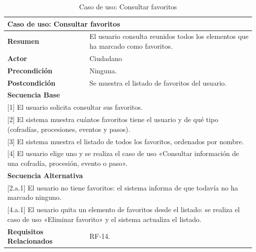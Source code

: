 \begin{table}[h!]
    \centering
    \renewcommand{\arraystretch}{1.5}

    \begin{tabular}{|p{4cm}|p{11cm}|}
        \hline
        \multicolumn{2}{|l|}{\textbf{Caso de uso: Consultar favoritos}} \\
        \hline
        \textbf{Resumen} & El usuario consulta reunidos todos los elementos que ha marcado como favoritos. \\
        \hline
        \textbf{Actor} & Ciudadano \\
        \hline
        \textbf{Precondición} & Ninguna. \\
        \hline
        \textbf{Postcondición} & Se muestra el listado de favoritos del usuario. \\
        \hline
        \multicolumn{2}{|l|}{\textbf{Secuencia Base}} \\
        \hline
        \multicolumn{2}{|p{15cm}|}{ [1] El usuario solicita consultar sus favoritos. } \\
        \hline
        \multicolumn{2}{|p{15cm}|}{ [2] El sistema muestra cuántos favoritos tiene el usuario y de qué tipo (cofradías, procesiones, eventos y pasos). } \\
        \hline
        \multicolumn{2}{|p{15cm}|}{ [3] El sistema muestra el listado de todos los favoritos, ordenados por nombre. } \\
        \hline
        \multicolumn{2}{|p{15cm}|}{ [4] El usuario elige uno y se realiza el caso de uso «Consultar información de una cofradía, procesión, evento o paso». } \\
        \hline
        \multicolumn{2}{|l|}{\textbf{Secuencia Alternativa}} \\
        \hline
        \multicolumn{2}{|p{15cm}|}{ [2.a.1] El usuario no tiene favoritos: el sistema informa de que todavía no ha marcado ninguno. } \\
        \hline
        \multicolumn{2}{|p{15cm}|}{ [4.a.1] El usuario quita un elemento de favoritos desde el listado: se realiza el caso de uso «Eliminar favorito» y el sistema actualiza el listado. } \\
        \hline
        \textbf{Requisitos Relacionados} & RF-14. \\
        \hline
    \end{tabular}
    \caption{Caso de uso: Consultar favoritos}
\end{table}

